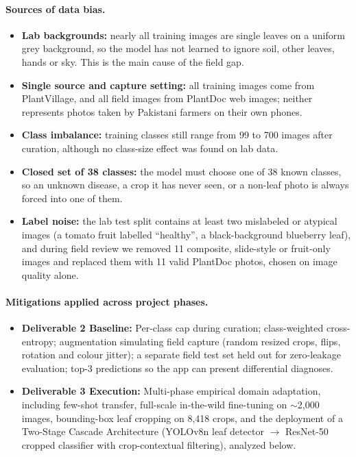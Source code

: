 \paragraph{Sources of data bias.}
\begin{itemize}[leftmargin=*]
    \item \textbf{Lab backgrounds:} nearly all training images are single leaves on a uniform grey background, so the model has not learned to ignore soil, other leaves, hands or sky. This is the main cause of the field gap.
    \item \textbf{Single source and capture setting:} all training images come from PlantVillage, and all field images from PlantDoc web images; neither represents photos taken by Pakistani farmers on their own phones.
    \item \textbf{Class imbalance:} training classes still range from 99 to 700 images after curation, although no class-size effect was found on lab data.
    \item \textbf{Closed set of 38 classes:} the model must choose one of 38 known classes, so an unknown disease, a crop it has never seen, or a non-leaf photo is always forced into one of them.
    \item \textbf{Label noise:} the lab test split contains at least two mislabeled or atypical images (a tomato fruit labelled ``healthy'', a black-background blueberry leaf), and during field review we removed 11 composite, slide-style or fruit-only images and replaced them with 11 valid PlantDoc photos, chosen on image quality alone.
\end{itemize}

\paragraph{Mitigations applied across project phases.}
\begin{itemize}[leftmargin=*]
    \item \textbf{Deliverable 2 Baseline:} Per-class cap during curation; class-weighted cross-entropy; augmentation simulating field capture (random resized crops, flips, rotation and colour jitter); a separate field test set held out for zero-leakage evaluation; top-3 predictions so the app can present differential diagnoses.
    \item \textbf{Deliverable 3 Execution:} Multi-phase empirical domain adaptation, including few-shot transfer, full-scale in-the-wild fine-tuning on $\sim$2,000 images, bounding-box leaf cropping on 8,418 crops, and the deployment of a Two-Stage Cascade Architecture (YOLOv8n leaf detector $\rightarrow$ ResNet-50 cropped classifier with crop-contextual filtering), analyzed below.
\end{itemize}

